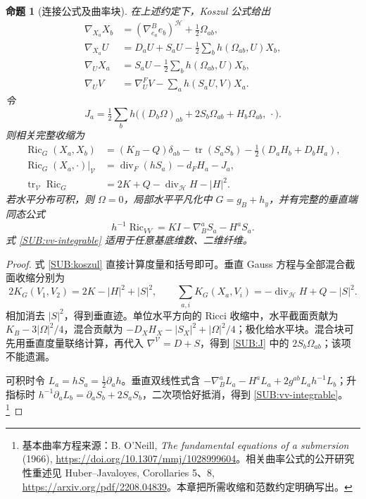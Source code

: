 \documentclass[UTF8,fontset=fandol,zihao=-4,oneside,openany]{ctexbook}
\theoremstyle{cjkplain}
\newtheorem{proposition}[theorem]{命题}
\numberwithin{equation}{chapter}
\begin{document}
\begin{proposition}[连接公式及曲率块]\label{SUB:blocks}
在上述约定下，Koszul 公式给出
\begin{equation}\label{SUB:koszul}
\begin{aligned}
\nabla_{X_a}X_b&=(\nabla^B_{e_a}e_b)^{\mathcal H}+\tfrac12\Omega_{ab},\\
\nabla_{X_a}U&=D_aU+S_aU-\tfrac12\sum_bh(\Omega_{ab},U)X_b,\\
\nabla_UX_a&=S_aU-\tfrac12\sum_bh(\Omega_{ab},U)X_b,\\
\nabla_UV&=\nabla^F_UV-\sum_ah(S_aU,V)X_a.
\end{aligned}
\end{equation}
令
\begin{equation}\label{SUB:J}
J_a=\tfrac12\sum_bh\bigl((D_b\Omega)_{ab}+2S_b\Omega_{ab}+H_b\Omega_{ab},\,\cdot\bigr).
\end{equation}
则相关完整收缩为
\begin{equation}\label{SUB:ricci}
\begin{aligned}
\operatorname{Ric}_G(X_a,X_b)
 &=(K_B-Q)\delta_{ab}-\operatorname{tr}(S_aS_b)
       -\tfrac12(D_aH_b+D_bH_a),\\
\operatorname{Ric}_G(X_a,\cdot)|_{\mathcal V}
 &=\operatorname{div}_F(hS_a)-d_FH_a-J_a,\\
\operatorname{tr}_{\mathcal V}\operatorname{Ric}_G
 &=2K+Q-\operatorname{div}_{\mathcal H}H-|H|^2.
\end{aligned}
\end{equation}
若水平分布可积，则 $\Omega=0$，局部水平平凡化中 $G=g_B+h_y$，并有完整的垂直端同态公式
\begin{equation}\label{SUB:vv-integrable}
h^{-1}\operatorname{Ric}_{VV}=KI-\nabla_B^aS_a-H^aS_a.
\end{equation}
式 \eqref{SUB:vv-integrable} 适用于任意基底维数、二维纤维。
\end{proposition}

\begin{proof}
式 \eqref{SUB:koszul} 直接计算度量和括号即可。垂直 Gauss 方程与全部混合截面收缩分别为
\[
2K_G(V_1,V_2)=2K-|H|^2+|S|^2,
\qquad
\sum_{a,i}K_G(X_a,V_i)=-\operatorname{div}_{\mathcal H}H+Q-|S|^2.
\]
相加消去 $|S|^2$，得到垂直迹。单位水平方向的 Ricci 收缩中，水平截面贡献为 $K_B-3|\Omega|^2/4$，混合贡献为 $-D_XH_X-|S_X|^2+|\Omega|^2/4$；极化给水平块。混合块可先用垂直度量联络计算，再代入 $\nabla^{\mathcal V}=D+S$，得到 \eqref{SUB:J} 中的 $2S_b\Omega_{ab}$；该项不能遗漏。

可积时令 $L_a=hS_a=\tfrac12\partial_ah$。垂直双线性式含
$-\nabla_B^aL_a-H^aL_a+2g^{ab}L_ah^{-1}L_b$；升指标时
$h^{-1}\partial_aL_b=\partial_aS_b+2S_aS_b$，二次项恰好抵消，得到 \eqref{SUB:vv-integrable}。\footnote{基本曲率方程来源：B. O'Neill, \emph{The fundamental equations of a submersion} (1966), \url{https://doi.org/10.1307/mmj/1028999604}。相关曲率公式的公开研究性重述见 Huber--Javaloyes, Corollaries 5、8, \url{https://arxiv.org/pdf/2208.04839}。本章把所需收缩和范数约定明确写出。}
\end{proof}
\end{document}
